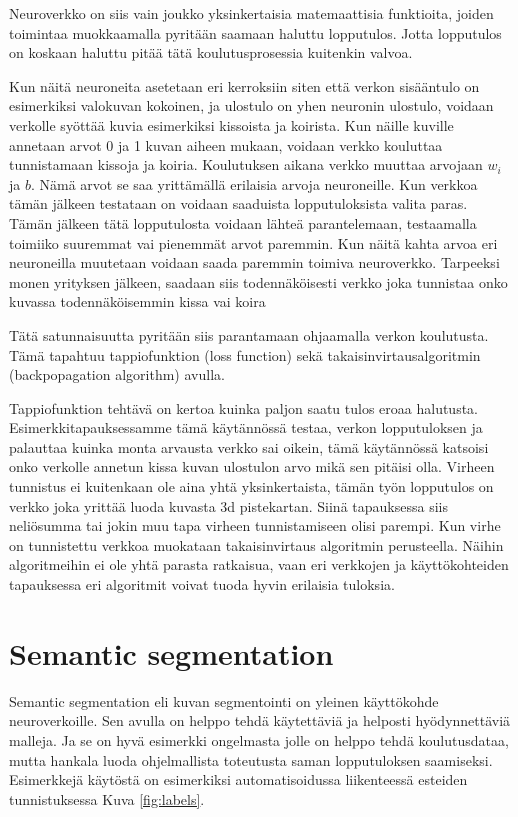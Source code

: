 Neuroverkko on siis vain joukko yksinkertaisia matemaattisia funktioita,
joiden toimintaa muokkaamalla pyritään saamaan haluttu lopputulos.
Jotta lopputulos on koskaan haluttu pitää tätä koulutusprosessia kuitenkin valvoa.


Kun näitä neuroneita asetetaan eri kerroksiin siten että verkon sisääntulo on esimerkiksi valokuvan kokoinen, 
ja ulostulo on yhen neuronin ulostulo, 
voidaan verkolle syöttää kuvia esimerkiksi kissoista ja koirista.
Kun näille kuville annetaan arvot 0 ja 1 kuvan aiheen mukaan, voidaan verkko kouluttaa tunnistamaan kissoja ja koiria.
Koulutuksen aikana verkko muuttaa arvojaan \(w_i\) ja \(b\).
Nämä arvot se saa yrittämällä erilaisia arvoja neuroneille.
Kun verkkoa tämän jälkeen testataan on voidaan saaduista lopputuloksista valita paras.
Tämän jälkeen tätä lopputulosta voidaan lähteä parantelemaan, testaamalla toimiiko suuremmat vai pienemmät arvot paremmin.
Kun näitä kahta arvoa eri neuroneilla muutetaan voidaan saada paremmin toimiva neuroverkko.
Tarpeeksi monen yrityksen jälkeen, saadaan siis todennäköisesti verkko joka tunnistaa onko kuvassa todennäköisemmin kissa vai koira

Tätä satunnaisuutta pyritään siis parantamaan ohjaamalla verkon koulutusta.
Tämä tapahtuu tappiofunktion (loss function) sekä takaisinvirtausalgoritmin (backpopagation algorithm) avulla.

Tappiofunktion tehtävä on kertoa kuinka paljon saatu tulos eroaa halutusta.
Esimerkkitapauksessamme tämä käytännössä testaa, verkon lopputuloksen ja palauttaa kuinka monta arvausta verkko sai oikein,
tämä käytännössä katsoisi onko verkolle annetun kissa kuvan ulostulon arvo mikä sen pitäisi olla.
Virheen tunnistus ei kuitenkaan ole aina yhtä yksinkertaista, tämän työn lopputulos on verkko joka yrittää luoda kuvasta 3d pistekartan.
Siinä tapauksessa siis neliösumma tai jokin muu tapa virheen tunnistamiseen olisi parempi.
Kun virhe on tunnistettu verkkoa muokataan takaisinvirtaus algoritmin perusteella.
Näihin algoritmeihin ei ole yhtä parasta ratkaisua, vaan eri verkkojen ja käyttökohteiden tapauksessa eri algoritmit voivat tuoda hyvin erilaisia tuloksia.

\section{Semantic segmentation}

Semantic segmentation eli kuvan segmentointi on yleinen käyttökohde neuroverkoille.
Sen avulla on helppo tehdä käytettäviä ja helposti hyödynnettäviä malleja.
Ja se on hyvä esimerkki ongelmasta jolle on helppo tehdä koulutusdataa, mutta hankala luoda ohjelmallista toteutusta saman lopputuloksen saamiseksi.
Esimerkkejä käytöstä on esimerkiksi automatisoidussa liikenteessä esteiden tunnistuksessa Kuva \ref{fig:labels}.

